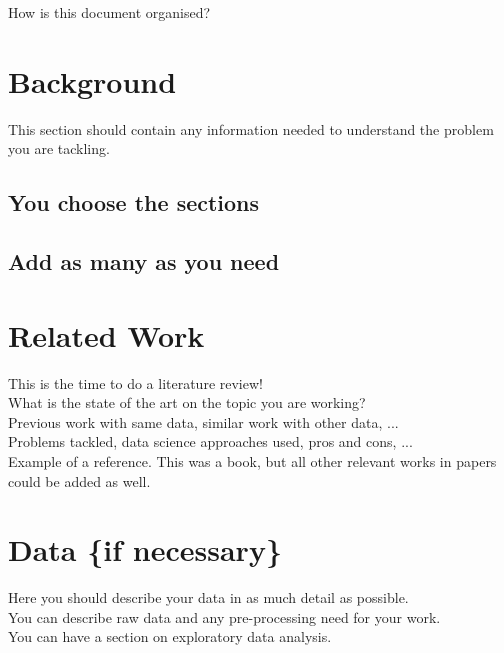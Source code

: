 \documentclass[sigplan]{acmart}
\begin{document}
How is this document organised? \\

\section{Background} \label{sec:background}

This section should contain any information needed to understand the problem you are tackling.

\subsection{You choose the sections} 



\subsection{Add as many as you need} 


\section{Related Work} \label{sec:relatedwork}

This is the time to do a literature review! \\

What is the state of the art on the topic you are working? \\

Previous work with same data, similar work with other data, ... \\

Problems tackled, data science approaches used, pros and cons, ... \\ 


Example of a reference\cite{lamport1994}. This was a book, but all other relevant works in papers \cite{turing1937} could be added as well.

\section{Data \{if necessary\} } \label{sec:data}

Here you should describe your data in as much detail as possible. \\ 

You can describe raw data and any pre-processing need for your work. \\

You can have a section on exploratory data analysis. \\
\end{document}
